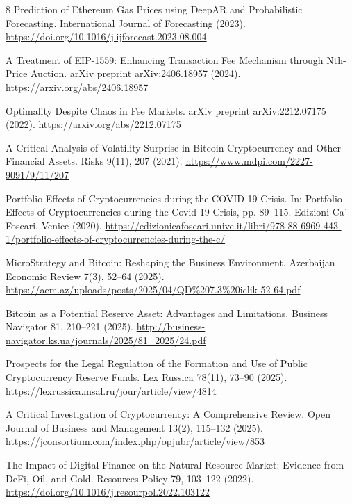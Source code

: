 \documentclass[runningheads]{llncs}
\begin{document}
\begin{thebibliography}{8}
Prediction of Ethereum Gas Prices using DeepAR and Probabilistic Forecasting.
International Journal of Forecasting (2023).
\url{https://doi.org/10.1016/j.ijforecast.2023.08.004}

A Treatment of EIP-1559: Enhancing Transaction Fee Mechanism through Nth-Price Auction.
arXiv preprint arXiv:2406.18957 (2024).
\url{https://arxiv.org/abs/2406.18957}

Optimality Despite Chaos in Fee Markets.
arXiv preprint arXiv:2212.07175 (2022).
\url{https://arxiv.org/abs/2212.07175}


A Critical Analysis of Volatility Surprise in Bitcoin Cryptocurrency and Other Financial Assets.
Risks 9(11), 207 (2021).
\url{https://www.mdpi.com/2227-9091/9/11/207}

Portfolio Effects of Cryptocurrencies during the COVID-19 Crisis.
In: Portfolio Effects of Cryptocurrencies during the Covid-19 Crisis, pp. 89--115.
Edizioni Ca' Foscari, Venice (2020).
\url{https://edizionicafoscari.unive.it/libri/978-88-6969-443-1/portfolio-effects-of-cryptocurrencies-during-the-c/}

MicroStrategy and Bitcoin: Reshaping the Business Environment.
Azerbaijan Economic Review 7(3), 52--64 (2025).
\url{https://aem.az/uploads/posts/2025/04/QD%207.3%20iclik-52-64.pdf}

Bitcoin as a Potential Reserve Asset: Advantages and Limitations.
Business Navigator 81, 210--221 (2025).
\url{http://business-navigator.ks.ua/journals/2025/81_2025/24.pdf}

Prospects for the Legal Regulation of the Formation and Use of Public Cryptocurrency Reserve Funds.
Lex Russica 78(11), 73--90 (2025).
\url{https://lexrussica.msal.ru/jour/article/view/4814}

A Critical Investigation of Cryptocurrency: A Comprehensive Review.
Open Journal of Business and Management 13(2), 115--132 (2025).
\url{https://jconsortium.com/index.php/opjubr/article/view/853}

The Impact of Digital Finance on the Natural Resource Market: Evidence from DeFi, Oil, and Gold.
Resources Policy 79, 103--122 (2022).
\url{https://doi.org/10.1016/j.resourpol.2022.103122}


\end{thebibliography}
\end{document}
